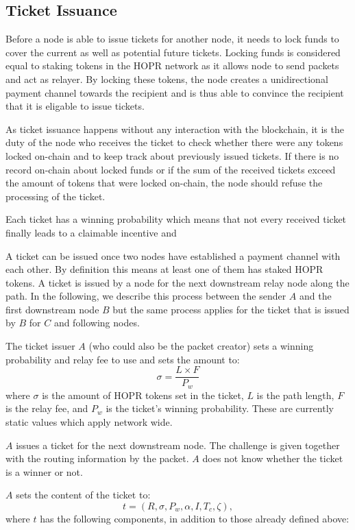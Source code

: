 \subsection{Ticket Issuance}
\label{sec:tickets:issuance}

Before a node is able to issue tickets for another node, it needs to lock funds to cover the current as well as potential future tickets. Locking funds is considered equal to staking tokens in the HOPR network as it allows node to send packets and act as relayer. By locking these tokens, the node creates a unidirectional payment channel towards the recipient and is thus able to convince the recipient that it is eligable to issue tickets.

As ticket issuance happens without any interaction with the blockchain, it is the duty of the node who receives the ticket to check whether there were any tokens locked on-chain and to keep track about previously issued tickets. If there is no record on-chain about locked funds or if the sum of the received tickets exceed the amount of tokens that were locked on-chain, the node should refuse the processing of the ticket.

Each ticket has a winning probability which means that not every received ticket finally leads to a claimable incentive and

A ticket can be issued once two nodes have established a payment channel with each other. By definition this means at least one of them has staked HOPR tokens. A ticket is issued by a node for the next downstream relay node along the path. In the following, we describe this process between the sender $A$ and the first downstream node $B$ but the same process applies for the ticket that is issued by $B$ for $C$ and following nodes.

The ticket issuer $A$ (who could also be the packet creator) sets a winning probability and relay fee to use and sets the amount to: $$\sigma=\frac{L\times F}{P_w}$$ where $\sigma$ is the amount of HOPR tokens set in the ticket, $L$ is the path length, $F$ is the relay fee, and $P_w$ is the ticket's winning probability. These are currently static values which apply network wide.

$A$ issues a ticket for the next downstream node. The challenge is given together with the routing information by the packet. $A$ does not know whether the ticket is a winner or not.

$A$ sets the content of the ticket to: $$t=(R,\sigma,P_w,\alpha,I,T_c,\zeta),$$ where $t$ has the following components, in addition to those already defined above:

